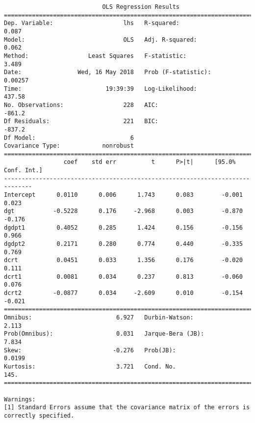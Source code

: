 \documentclass[12pt,fleqn]{article}\usepackage{../../common}
\begin{document}
\begin{verbatim}
                            OLS Regression Results                            
==============================================================================
Dep. Variable:                    lhs   R-squared:                       0.087
Model:                            OLS   Adj. R-squared:                  0.062
Method:                 Least Squares   F-statistic:                     3.489
Date:                Wed, 16 May 2018   Prob (F-statistic):            0.00257
Time:                        19:39:39   Log-Likelihood:                 437.58
No. Observations:                 228   AIC:                            -861.2
Df Residuals:                     221   BIC:                            -837.2
Df Model:                           6                                         
Covariance Type:            nonrobust                                         
==============================================================================
                 coef    std err          t      P>|t|      [95.0% Conf. Int.]
------------------------------------------------------------------------------
Intercept      0.0110      0.006      1.743      0.083        -0.001     0.023
dgt           -0.5228      0.176     -2.968      0.003        -0.870    -0.176
dgdpt1         0.4052      0.285      1.424      0.156        -0.156     0.966
dgdpt2         0.2171      0.280      0.774      0.440        -0.335     0.769
dcrt           0.0451      0.033      1.356      0.176        -0.020     0.111
dcrt1          0.0081      0.034      0.237      0.813        -0.060     0.076
dcrt2         -0.0877      0.034     -2.609      0.010        -0.154    -0.021
==============================================================================
Omnibus:                        6.927   Durbin-Watson:                   2.113
Prob(Omnibus):                  0.031   Jarque-Bera (JB):                7.834
Skew:                          -0.276   Prob(JB):                       0.0199
Kurtosis:                       3.721   Cond. No.                         145.
==============================================================================

Warnings:
[1] Standard Errors assume that the covariance matrix of the errors is correctly specified.
\end{verbatim}
\end{document}
